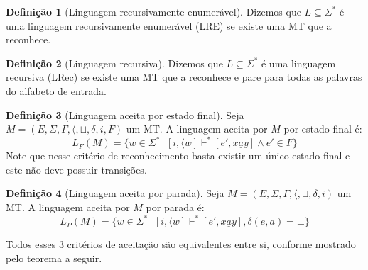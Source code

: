 \documentclass[a4paper]{article}
\theoremstyle{definition}
\newtheorem{Definition}{Definição}
\begin{document}
  \begin{Definition}[Linguagem recursivamente enumerável]
    Dizemos que $L \subseteq \Sigma^*$ é uma linguagem recursivamente enumerável (LRE)
    se existe uma MT que a reconhece.
  \end{Definition}

  \begin{Definition}[Linguagem recursiva]
    Dizemos que $L \subseteq \Sigma^*$ é uma linguagem recursiva (LRec) se
    existe uma MT que a reconhece e pare para todas as palavras do alfabeto de entrada.
  \end{Definition}

  \begin{Definition}[Linguagem aceita por estado final]
    Seja $M = (E,\Sigma,\Gamma,\langle, \sqcup, \delta, i, F)$ um MT. A
    linguagem aceita por $M$ por estado final é:
    \[
      L_F(M) = \{w \in \Sigma^*\,|\,[i,\langle w] \vdash^* [e', x\underline{a}y]
      \land e' \in F\}
    \]
    Note que nesse critério de reconhecimento basta existir um único estado
    final e este não deve possuir transições.
  \end{Definition}

  \begin{Definition}[Linguagem aceita por parada]
    Seja $M = (E,\Sigma,\Gamma,\langle, \sqcup, \delta, i)$ um MT. A
    linguagem aceita por $M$ por parada é:
    \[
      L_P(M) = \{w \in \Sigma^*\,|\,[i,\langle w] \vdash^* [e', x\underline{a}y],
      \delta(e,a) = \bot \}
    \]
  \end{Definition}

  Todos esses 3 critérios de aceitação são equivalentes entre si, conforme
  mostrado pelo teorema a seguir.
\end{document}
